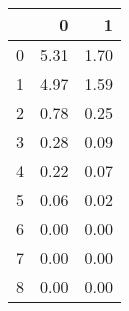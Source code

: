 \begin{tabular}{lrr}
\toprule
{} &     0 &     1 \\
\midrule
0 &  5.31 &  1.70 \\
1 &  4.97 &  1.59 \\
2 &  0.78 &  0.25 \\
3 &  0.28 &  0.09 \\
4 &  0.22 &  0.07 \\
5 &  0.06 &  0.02 \\
6 &  0.00 &  0.00 \\
7 &  0.00 &  0.00 \\
8 &  0.00 &  0.00 \\
\bottomrule
\end{tabular}
